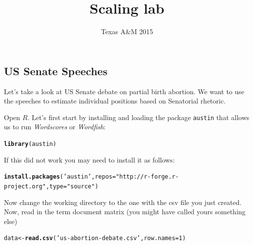 \documentclass[10pt,a4paper]{article}\usepackage[]{graphicx}\usepackage[]{color}
\author{Texas A\&M  2015}
\title{Scaling lab}
\date{}
\makeatletter
\newcommand{\hlnum}[1]{\textcolor[rgb]{0.686,0.059,0.569}{#1}}%
\newcommand{\hlstr}[1]{\textcolor[rgb]{0.192,0.494,0.8}{#1}}%
\newcommand{\hlstd}[1]{\textcolor[rgb]{0.345,0.345,0.345}{#1}}%
\newcommand{\hlkwb}[1]{\textcolor[rgb]{0.69,0.353,0.396}{#1}}%
\newcommand{\hlkwc}[1]{\textcolor[rgb]{0.333,0.667,0.333}{#1}}%
\newcommand{\hlkwd}[1]{\textcolor[rgb]{0.737,0.353,0.396}{\textbf{#1}}}%
\newenvironment{kframe}{%
 \def\at@end@of@kframe{}%
 \ifinner\ifhmode%
  \def\at@end@of@kframe{\end{minipage}}%
  \begin{minipage}{\columnwidth}%
 \fi\fi%
 \def\FrameCommand##1{\hskip\@totalleftmargin \hskip-\fboxsep
 \colorbox{shadecolor}{##1}\hskip-\fboxsep
     \hskip-\linewidth \hskip-\@totalleftmargin \hskip\columnwidth}%
 \MakeFramed {\advance\hsize-\width
   \@totalleftmargin\z@ \linewidth\hsize
   \@setminipage}}%
 {\par\unskip\endMakeFramed%
 \at@end@of@kframe}
\newenvironment{knitrout}{}{} %
\makeatother
\begin{document}
\maketitle


\subsection*{US Senate Speeches}

Let's take a look at US Senate debate on partial birth abortion. We want to use the speeches to estimate individual positions based on Senatorial rhetoric. 



Open $R$. Let's first start by installing and loading the package \texttt{austin} that allows us to run \textit{Wordscores} or \textit{Wordfish}: 
\begin{knitrout}
\color{fgcolor}\begin{kframe}
\begin{alltt}
\hlkwd{library}\hlstd{(austin)}
\end{alltt}


{\ttfamily\noindent\itshape\color{messagecolor}{\#\# Loading required package: numDeriv}}\end{kframe}
\end{knitrout}
If this did not work you may need to install it as follows:
\begin{knitrout}
\color{fgcolor}\begin{kframe}
\begin{alltt}
\hlkwd{install.packages}\hlstd{(}\hlstr{'austin'}\hlstd{,} \hlkwc{repos}\hlstd{=}\hlstr{"http://r-forge.r-project.org"}\hlstd{,} \hlkwc{type}\hlstd{=}\hlstr{"source"}\hlstd{)}
\end{alltt}
\end{kframe}
\end{knitrout}
Now change the working directory to the one with the csv file you just created. Now, read in the term document matrix (you might have called yours something else)
\begin{knitrout}
\color{fgcolor}\begin{kframe}
\begin{alltt}
\hlstd{data} \hlkwb{<-} \hlkwd{read.csv}\hlstd{(}\hlstr{'us-abortion-debate.csv'}\hlstd{,} \hlkwc{row.names}\hlstd{=}\hlnum{1}\hlstd{)}
\end{alltt}
\end{kframe}
\end{knitrout}
\end{document}
